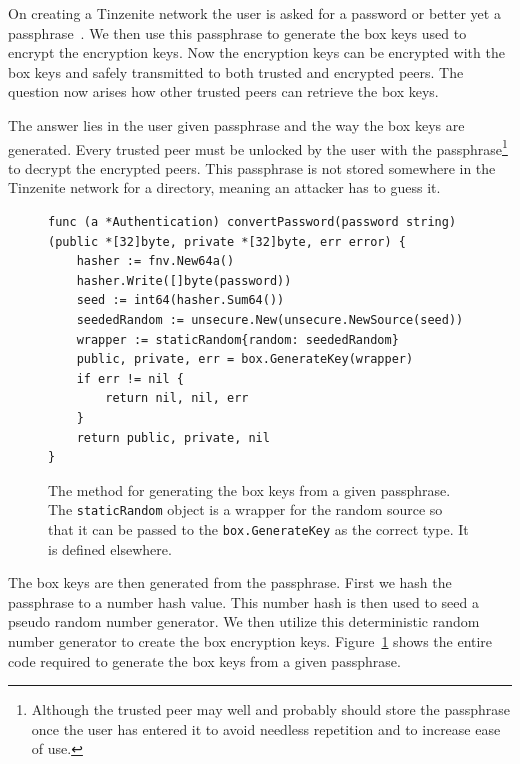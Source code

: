 On creating a Tinzenite network the user is asked for a password or better yet a passphrase~\cite{web:site:xkcd:pwd_strength}.
We then use this passphrase to generate the box keys used to encrypt the encryption keys.
Now the encryption keys can be encrypted with the box keys and safely transmitted to both trusted and encrypted peers.
The question now arises how other trusted peers can retrieve the box keys.

The answer lies in the user given passphrase and the way the box keys are generated.
Every trusted peer must be unlocked by the user with the passphrase\footnote{Although the trusted peer may well and probably should store the passphrase once the user has entered it to avoid needless repetition and to increase ease of use.} to decrypt the encrypted peers.
This passphrase is not stored somewhere in the Tinzenite network for a directory, meaning an attacker has to guess it.

\begin{figure}[htp]
    \begin{lstlisting}[language=golang,firstnumber=0]
func (a *Authentication) convertPassword(password string) (public *[32]byte, private *[32]byte, err error) {
	hasher := fnv.New64a()
	hasher.Write([]byte(password))
	seed := int64(hasher.Sum64())
	seededRandom := unsecure.New(unsecure.NewSource(seed))
	wrapper := staticRandom{random: seededRandom}
	public, private, err = box.GenerateKey(wrapper)
	if err != nil {
		return nil, nil, err
	}
	return public, private, nil
}
    \end{lstlisting}
\caption[Golang Box Key Generation]{The method for generating the box keys from a given passphrase. The \texttt{staticRandom} object is a wrapper for the random source so that it can be passed to the \texttt{box.GenerateKey} as the correct type. It is defined elsewhere.}
\label{golang:boxkey_gen}
\end{figure}

The box keys are then generated from the passphrase.
First we hash the passphrase to a number hash value.
This number hash is then used to seed a pseudo random number generator.
We then utilize this deterministic random number generator to create the box encryption keys.
Figure~\ref{golang:boxkey_gen} shows the entire code required to generate the box keys from a given passphrase.

